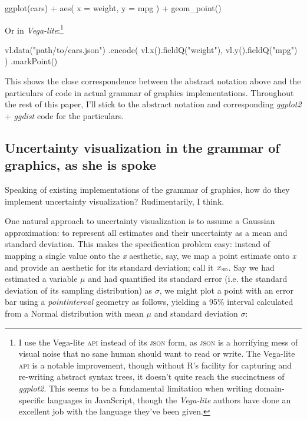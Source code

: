 \documentclass[journal]{vgtc}                     %
\newenvironment{centerverbatim}{%
  \hfill\break
  \small
  \centering
  \varwidth{\linewidth}%
  \verbatim
}{%
  \endverbatim
  \endvarwidth
  \par
  \hfill\break
}
\begin{document}
\begin{centerverbatim}
ggplot(cars) +
  aes(
    x = weight,
    y = mpg
  ) +
  geom_point()
\end{centerverbatim}

Or in \textit{Vega-lite}:\footnote{I use the Vega-lite \textsc{api} instead of its \textsc{json} form, as \textsc{json} is a horrifying mess of visual noise that no sane human should want to read or write. The Vega-lite \textsc{api} is a notable improvement, though without R's facility for capturing and re-writing abstract syntax trees, it doesn't quite reach the succinctness of \textit{ggplot2}. This seems to be a fundamental limitation when writing domain-specific languages in JavaScript, though the \textit{Vega-lite} authors have done an excellent job with the language they've been given.}

\begin{centerverbatim}
vl.data("path/to/cars.json")
  .encode(
    vl.x().fieldQ("weight"),
    vl.y().fieldQ("mpg")
  )
  .markPoint()
\end{centerverbatim}

This shows the close correspondence between the abstract notation above and the particulars of code in actual grammar of graphics implementations. Throughout the rest of this paper, I'll stick to the abstract notation and corresponding \textit{ggplot2} + \textit{ggdist} code for the particulars.

\subsection{Uncertainty visualization in the grammar of graphics, as she is spoke}

Speaking of existing implementations of the grammar of graphics, how do they implement uncertainty visualization? Rudimentarily, I think.

One natural approach to uncertainty visualization is to assume a Gaussian approximation: to represent all estimates and their uncertainty as a mean and standard deviation. This makes the specification problem easy: instead of mapping a single value onto the \textit{x} aesthetic, say, we map a point estimate onto \textit{x} and provide an aesthetic for its standard deviation; call it $x_\textsc{sd}$. Say we had estimated a variable $\mu$ and had quantified its standard error (i.e. the standard deviation of its sampling distribution) as $\sigma$, we might plot a point with an error bar using a \textit{pointinterval} geometry as follows, yielding a 95\% interval calculated from a Normal distribution with mean $\mu$ and standard deviation $\sigma$:
\end{document}
